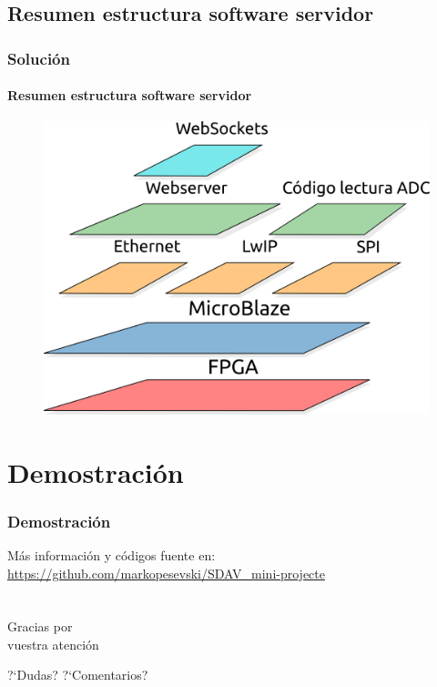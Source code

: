 \documentclass[compress]{beamer}
\begin{document}
	\subsection{Resumen estructura software servidor}
		\begin{frame}
			\frametitle{Soluci\'on}
			\framesubtitle{Resumen estructura software servidor}
				\begin{figure}
					\includegraphics[keepaspectratio = true, totalheight=0.7\textheight]{figuras/capas_server.png}
				\end{figure}
 		\end{frame}

\section{Demostraci\'on}
		\begin{frame}
			\frametitle{Demostraci\'on}
			\vfill
			M\'as informaci\'on y c\'odigos fuente en:
			\url{https://github.com/markopesevski/SDAV_mini-projecte}
			\vfill
 		\end{frame}


\section*{}
\begin{frame}[plain]
	\addtocounter{framenumber}{-1}

	\begin{center}
		{\Huge{Gracias por\\vuestra atenci\'on}}
	\end{center}
	\begin{center}
		{\large{?`Dudas? ?`Comentarios?}}
	\end{center}
\end{frame}

\end{document}
